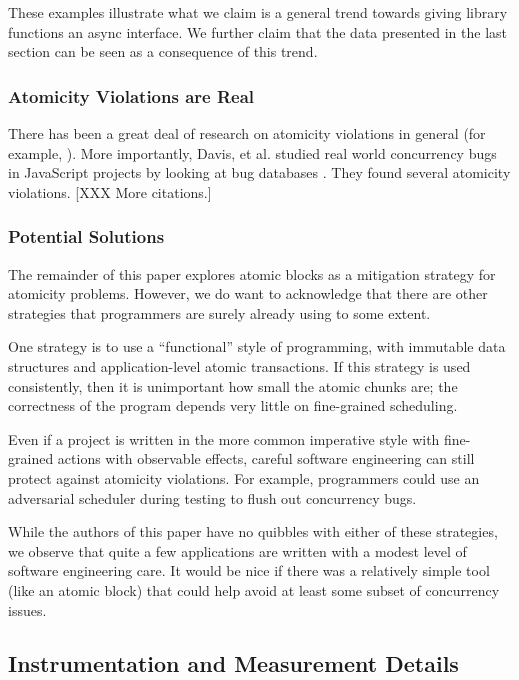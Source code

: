 \documentclass[acmsmall,anonymous,review]{acmart}\settopmatter{printfolios=true,printccs=false,printacmref=false}
\begin{document}
These examples illustrate what we claim is a general trend towards giving library functions an async interface.
We further claim that the data presented in the last section can be seen as a consequence of this trend.

\subsubsection{Atomicity Violations are Real}

There has been a great deal of research on atomicity violations in general (for example, \cite{Lu2008}).
More importantly, Davis, et al. studied real world concurrency bugs in JavaScript projects by looking at bug databases \cite{Davis2017}.
They found several atomicity violations.
[XXX More citations.]

\subsubsection{Potential Solutions}

The remainder of this paper explores atomic blocks as a mitigation strategy for atomicity problems.
However, we do want to acknowledge that there are other strategies that programmers are surely already using to some extent.

One strategy is to use a ``functional'' style of programming, with immutable data structures and application-level atomic transactions.
If this strategy is used consistently, then it is unimportant how small the atomic chunks are; the correctness of the program depends very little on fine-grained scheduling.

Even if a project is written in the more common imperative style with fine-grained actions with observable effects, careful software engineering can still protect against atomicity violations.
For example, programmers could use an adversarial scheduler during testing to flush out concurrency bugs.

While the authors of this paper have no quibbles with either of these strategies, we observe that quite a few applications are written with a modest level of software engineering care.
It would be nice if there was a relatively simple tool (like an atomic block) that could help avoid at least some subset of concurrency issues.

\subsection{Instrumentation and Measurement Details}
\end{document}
